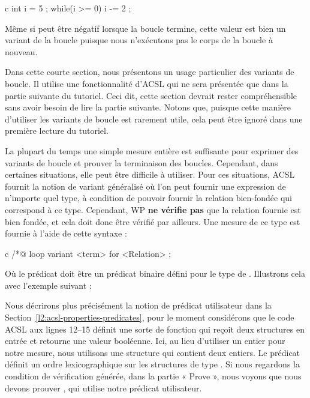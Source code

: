 \begin{CodeBlock}{c}
int i = 5 ;
while(i >= 0){
  i -= 2 ;
}
\end{CodeBlock}


Même si  peut être négatif lorsque la boucle termine, cette valeur
est bien un variant de la boucle puisque nous n'exécutons pas le corps de la
boucle à nouveau.


\label{l4:statements-loops-general-measure}


\begin{Information}
  Dans cette courte section, nous présentons un usage particulier des variants
  de boucle. Il utilise une fonctionnalité d'ACSL qui ne sera présentée que dans
  la partie suivante du tutoriel. Ceci dit, cette section devrait rester
  compréhensible sans avoir besoin de lire la partie suivante. Notons que,
  puisque cette manière d'utiliser les variants de boucle est rarement utile,
  cela peut être ignoré dans une première lecture du tutoriel.
\end{Information}


La plupart du temps une simple mesure entière est suffisante pour exprimer des
variants de boucle et prouver la terminaison des boucles. Cependant, dans
certaines situations, elle peut être difficile à utiliser. Pour ces situations,
ACSL fournit la notion de variant généralisé où l'on peut fournir une expression
de n'importe quel type, à condition de pouvoir fournir la relation bien-fondée
qui correspond à ce type. Cependant, WP \textbf{ne vérifie pas} que la relation
fournie est bien fondée, et cela doit donc être vérifié par ailleurs. Une mesure
de ce type est fournie à l'aide de cette syntaxe :


\begin{CodeBlock}{c}
/*@ loop variant <term> for <Relation> ;
\end{CodeBlock}


Où le prédicat  doit être un prédicat binaire défini pour
le type de . Illustrons cela avec l'exemple suivant :




Nous décrirons plus précisément la notion de prédicat utilisateur dans la
Section~\ref{l2:acsl-properties-predicates}, pour le moment considérons que le
code ACSL aux lignes 12--15 définit une sorte de fonction qui reçoit deux
structures en entrée et retourne une valeur booléenne. Ici, au lieu d'utiliser
un entier pour notre mesure, nous utilisons une structure qui contient deux
entiers. Le prédicat  définit un ordre lexicographique sur
les structures de type . Si nous regardons la condition de
vérification générée, dans la partie « Prove », nous voyons que nous devons
prouver , qui utilise notre prédicat utilisateur.


